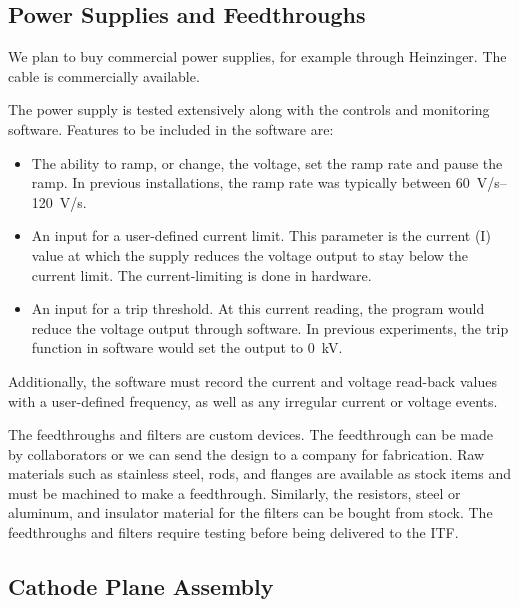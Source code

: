 \subsection{Power Supplies and Feedthroughs}
\label{sec:fdsp-hv-supplies-feedthroughs}

We plan to buy commercial power supplies, %
for example through Heinzinger. The  cable is commercially available.

The power supply is tested extensively along with the controls and monitoring software.  Features to be included in the software are:
\begin{itemize}
\item The ability to ramp, or change, the voltage, set the ramp rate and pause the ramp. %
In previous installations, the ramp rate was typically between \SIrange{60}{120}{V/s}.
\item An input for a user-defined current limit.  This parameter is the current (I) value at which the supply reduces the voltage output to stay below the current limit.  The current-limiting is done in hardware.
\item An input for a trip threshold.  At this current reading, the program would reduce the voltage output through software.  In previous experiments, the trip function in software would set the output to \SI{0}{kV}.
\end{itemize}
Additionally, the software must
record the current and voltage read-back values with a user-defined frequency, as well as any irregular current or voltage events.

The  feedthroughs and filters are custom devices.  %
The feedthrough can be made by collaborators or we can send the design to a company for fabrication.  Raw materials such as stainless steel,  rods, and flanges are available as stock items and must be machined to make a feedthrough.  Similarly, the resistors, steel or aluminum, and insulator material for the filters can be bought from stock.  The feedthroughs and filters require testing before being delivered to the ITF. 

\subsection{Cathode Plane Assembly}
\label{sec:fdsp-hv-prod-cpa}

